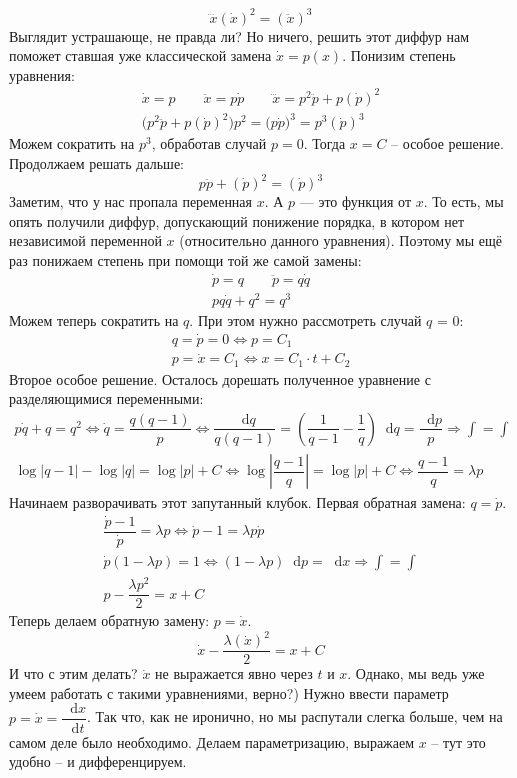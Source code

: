 \documentclass[a4paper,12pt]{article}
\renewcommand*\d{\mathop{}\!\mathrm{d}}
\newcommand{\dpp}{\dot{p}}
\newcommand{\ddpp}{\ddot{p}}
\newcommand{\dqq}{\dot{q}}
\newcommand{\dx}{\dot{x}}
\newcommand{\ddx}{\ddot{x}}
\newcommand{\dddx}{\dddot{x}}
\newcommand{\bto}{\Longrightarrow}
\newcommand{\ds}{\displaystyle}
\begin{document}
\[\dddx(\dx)^2 = (\ddx)^3\]
Выглядит устрашающе, не правда ли? Но ничего, решить этот диффур нам поможет ставшая уже классической замена $\dx = p(x)$. Понизим степень уравнения:
\begin{gather*}
	\dx = p\qquad\ddx = p\dpp \qquad \dddx = p^2\ddpp + p(\dpp)^2\\
	\big(p^2\ddpp + p(\dpp)^2\big)p^2 = \big(p\dpp\big)^3 = p^3(\dpp)^3
\end{gather*}
Можем сократить на $p^3$, обработав случай $p = 0$. Тогда $x = C$ -- особое решение. Продолжаем решать дальше:
\[
	p\ddpp + (\dpp)^2 = (\dpp)^3
\]
Заметим, что у нас пропала переменная $x$. А $p$ --- это функция от $x$. То есть, мы опять получили диффур, допускающий понижение порядка, в котором нет независимой переменной $x$ (относительно данного уравнения). Поэтому мы ещё раз понижаем степень при помощи той же самой замены:
\begin{gather*}
	\dpp = q \qquad \ddpp = q\dqq\\
	pq\dqq + q^2 = q^3
\end{gather*}
Можем теперь сократить на $q$. При этом нужно рассмотреть случай $q$ = 0:
\begin{gather*}
	q = \dpp = 0 \iff p = C_1\\
	p = \dx = C_1 \iff x = C_1\cdot t + C_2
\end{gather*}
Второе особое решение. Осталось дорешать полученное уравнение с разделяющимися переменными:
\begin{gather*}
	p\dqq + q = q^2 \iff \dqq = \dfrac{q(q - 1)}{p} \iff \dfrac{\d q}{q(q - 1)} = \left(\dfrac{1}{q - 1} - \dfrac{1}{q}\right)\d q =  \dfrac{\d p}{p} \bto \ds\int = \int\\
	\log|q - 1| - \log|q| = \log|p| + C \iff \log\left|\dfrac{q - 1}{q}\right| = \log|p| + C \iff \dfrac{q - 1}{q} = \lambda p
\end{gather*}
Начинаем разворачивать этот запутанный клубок. Первая обратная замена: $q = \dpp$.
\begin{gather*}
	\dfrac{\dpp - 1}{\dpp} = \lambda p \iff \dpp - 1 = \lambda p\dpp \\
	\dpp(1 - \lambda p) = 1 \iff (1 - \lambda p)\d p = \d x \bto \ds\int = \int\\
	p - \dfrac{\lambda p^2}{2} = x + C
\end{gather*}
Теперь делаем обратную замену: $p = \dx$.
\[\dx - \dfrac{\lambda (\dx)^2}{2} = x + C\]
И что с этим делать? $\dx$ не выражается явно через $t$ и $x$. Однако, мы ведь уже умеем работать с такими уравнениями, верно?) Нужно ввести параметр $p = \dx = \dfrac{\d x}{\d t}$. Так что, как не иронично, но мы распутали слегка больше, чем на самом деле было необходимо. Делаем параметризацию, выражаем $x$ -- тут это удобно -- и дифференцируем.
\end{document}
